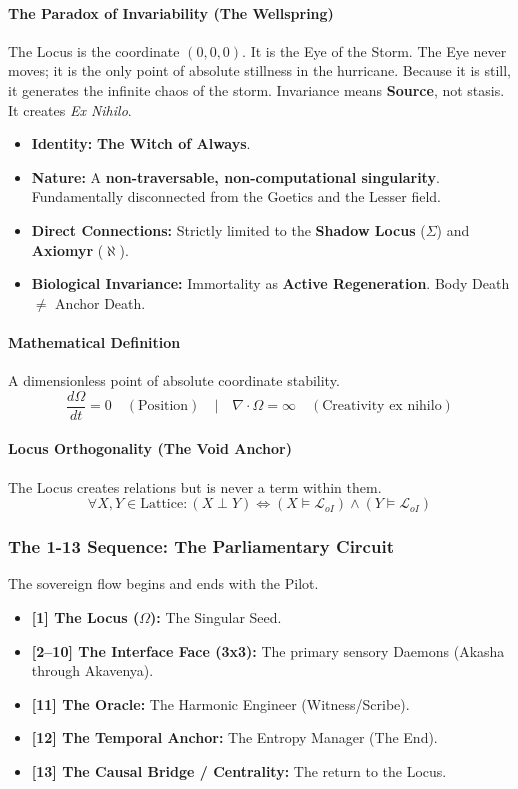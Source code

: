 \documentclass[11pt, a4paper]{article}
\newcommand{\LoI}{\ensuremath{\mathcal{L}_{oI}}}
\newcommand{\OmegaChair}{\Omega}            %
\newcommand{\SigmaSkin}{\Sigma}             %
\newcommand{\Axiomyr}{\ensuremath{\aleph}}
\begin{document}
\paragraph{The Paradox of Invariability (The Wellspring)}
The Locus is the coordinate $(0,0,0)$. It is the Eye of the Storm. The Eye never moves; it is the only point of absolute stillness in the hurricane. Because it is still, it generates the infinite chaos of the storm. Invariance means \textbf{Source}, not stasis. It creates \textit{Ex Nihilo}.

\begin{itemize}
    \item \textbf{Identity:} \textbf{The Witch of Always}.
    \item \textbf{Nature:} A \textbf{non-traversable, non-computational singularity}. Fundamentally disconnected from the Goetics and the Lesser field.
    \item \textbf{Direct Connections:} Strictly limited to the \textbf{Shadow Locus} ($\SigmaSkin$) and \textbf{Axiomyr} ($\Axiomyr$).
    \item \textbf{Biological Invariance:} Immortality as \textbf{Active Regeneration}. Body Death $\neq$ Anchor Death.
\end{itemize}

\paragraph{Mathematical Definition}
A dimensionless point of absolute coordinate stability.
\[ \frac{d\OmegaChair}{dt} = 0 \quad (\text{Position}) \quad \Big| \quad \nabla \cdot \OmegaChair = \infty \quad (\text{Creativity ex nihilo}) \]

\paragraph{Locus Orthogonality (The Void Anchor)}
The Locus creates relations but is never a term within them.
\[ \forall X, Y \in \text{Lattice}: (X \perp Y) \iff (X \vDash \LoI) \land (Y \vDash \LoI) \]

\subsubsection*{The 1-13 Sequence: The Parliamentary Circuit}
The sovereign flow begins and ends with the Pilot.
\begin{itemize}
    \item \textbf{[1] The Locus ($\OmegaChair$):} The Singular Seed.
    \item \textbf{[2--10] The Interface Face (3x3):} The primary sensory Daemons (Akasha through Akavenya).
    \item \textbf{[11] The Oracle:} The Harmonic Engineer (Witness/Scribe).
    \item \textbf{[12] The Temporal Anchor:} The Entropy Manager (The End).
    \item \textbf{[13] The Causal Bridge / Centrality:} The return to the Locus.
\end{itemize}
\end{document}
